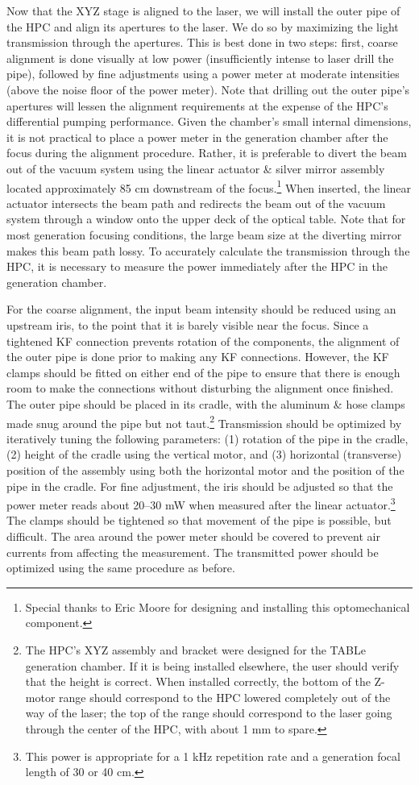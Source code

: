 Now that the XYZ stage is aligned to the laser, we will install the outer pipe of the HPC and align its apertures to the laser. We do so by maximizing the light transmission through the apertures. This is best done in two steps: first, coarse alignment is done visually at low power (insufficiently intense to laser drill the pipe), followed by fine adjustments using a power meter at moderate intensities (above the noise floor of the power meter). Note that drilling out the outer pipe's apertures will lessen the alignment requirements at the expense of the HPC's differential pumping performance. Given the chamber's small internal dimensions, it is not practical to place a power meter in the generation chamber after the focus during the alignment procedure. Rather, it is preferable to divert the beam out of the vacuum system using the linear actuator \& silver mirror assembly located approximately 85 cm downstream of the focus.\footnote{Special thanks to Eric Moore for designing and installing this optomechanical component.} When inserted, the linear actuator intersects the beam path and redirects the beam out of the vacuum system through a window onto the upper deck of the optical table. Note that for most generation focusing conditions, the large beam size at the diverting mirror makes this beam path lossy. To accurately calculate the transmission through the HPC, it is necessary to measure the power immediately after the HPC in the generation chamber.

For the coarse alignment, the input beam intensity should be reduced using an upstream iris, to the point that it is barely visible near the focus. Since a tightened KF connection prevents rotation of the components, the alignment of the outer pipe is done prior to making any KF connections. However, the KF clamps should be fitted on either end of the pipe to ensure that there is enough room to make the connections without disturbing the alignment once finished. The outer pipe should be placed in its cradle, with the aluminum \& hose clamps made snug around the pipe but not taut.\footnote{The HPC's XYZ assembly and bracket were designed for the TABLe generation chamber. If it is being installed elsewhere, the user should verify that the height is correct. When installed correctly, the bottom of the Z-motor range should correspond to the HPC lowered completely out of the way of the laser; the top of the range should correspond to the laser going through the center of the HPC, with about 1 mm to spare.} Transmission should be optimized by iteratively tuning the following parameters: (1) rotation of the pipe in the cradle, (2) height of the cradle using the vertical motor, and (3) horizontal (transverse) position of the assembly using both the horizontal motor and the position of the pipe in the cradle. For fine adjustment, the iris should be adjusted so that the power meter reads about 20--30 mW when measured after the linear actuator.\footnote{This power is appropriate for a 1 kHz repetition rate and a generation focal length of 30 or 40 cm.} The clamps should be tightened so that movement of the pipe is possible, but difficult. The area around the power meter should be covered to prevent air currents from affecting the measurement. The transmitted power should be optimized using the same procedure as before.

